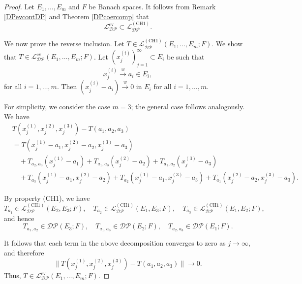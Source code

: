 \documentclass[12 pt]{article}%
\newtheorem{final remark}[theorem]{Final Remark}
\begin{document}
\begin{proof}
	Let $E_1,\dots,E_m$ and $F$ be Banach spaces. It follows from Remark \ref{DPevcontDP} and Theorem \ref{DPcoercomp} that
	\begin{equation*}
		\mathcal{L_{DP}^{\mathrm{ev}}} \subset \mathcal{L_{DP}^{\mathrm{(CH1)}}}.
	\end{equation*}
	
	We now prove the reverse inclusion. Let $T \in \mathcal{L_{DP}^{\mathrm{(CH1)}}}(E_1,\dots,E_m;F)$. We show that $T \in \mathcal{L_{DP}^{\mathrm{ev}}}(E_1,\dots,E_m;F)$. Let $(x_j^{(i)})_{j=1}^{\infty} \subset E_i$ be such that
	\begin{equation*}
		x_j^{(i)} \overset{w}{\to} a_i \in E_i,
	\end{equation*}
	for all $i=1,\dots,m$. Then $(x_j^{(i)} - a_i) \overset{w}{\to} 0$ in $E_i$ for all $i=1,\dots,m$.
	
	For simplicity, we consider the case $m=3$; the general case follows analogously. We have
	\begin{align*}
		&T(x_j^{(1)},x_j^{(2)},x_j^{(3)}) - T(a_1,a_2,a_3) \\
		&= T(x_j^{(1)}-a_1, x_j^{(2)}-a_2, x_j^{(3)}-a_3) \\
		&\quad + T_{a_2,a_3}(x_j^{(1)}-a_1) + T_{a_1,a_3}(x_j^{(2)}-a_2) + T_{a_1,a_2}(x_j^{(3)}-a_3) \\
		&\quad + T_{a_3}(x_j^{(1)}-a_1, x_j^{(2)}-a_2) + T_{a_2}(x_j^{(1)}-a_1, x_j^{(3)}-a_3) + T_{a_1}(x_j^{(2)}-a_2, x_j^{(3)}-a_3).
	\end{align*}
	
	By property (CH1), we have
	\begin{equation*}
		T_{a_1} \in \mathcal{L_{DP}^{\mathrm{(CH1)}}}(E_2,E_3;F), \quad
		T_{a_2} \in \mathcal{L_{DP}^{\mathrm{(CH1)}}}(E_1,E_3;F), \quad
		T_{a_3} \in \mathcal{L_{DP}^{\mathrm{(CH1)}}}(E_1,E_2;F),
	\end{equation*}
	and hence
	\begin{equation*}
		T_{a_1,a_2} \in \mathcal{DP}(E_3;F), \quad
		T_{a_1,a_3} \in \mathcal{DP}(E_2;F), \quad
		T_{a_2,a_3} \in \mathcal{DP}(E_1;F).
	\end{equation*}
	
	It follows that each term in the above decomposition converges to zero as $j \to \infty$, and therefore
	\begin{equation*}
		\|T(x_j^{(1)},x_j^{(2)},x_j^{(3)}) - T(a_1,a_2,a_3)\| \to 0.
	\end{equation*}
	Thus, $T \in \mathcal{L_{DP}^{\mathrm{ev}}}(E_1,\dots,E_m;F)$.
\end{proof}
\end{document}
